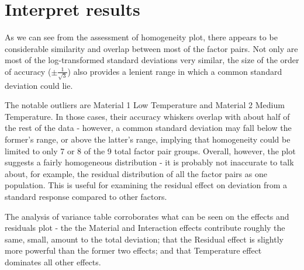 \documentclass[]{article}
\begin{document}
\section{Interpret results}
As we can see from the assessment of homogeneity plot, there appears to be considerable similarity and overlap between most of the factor pairs. Not only are most of the log-transformed standard deviations very similar, the size of the order of accuracy ($\pm\frac{1}{\sqrt{3}}$) also provides a lenient range in which a common standard deviation could lie.

The notable outliers are Material 1 Low Temperature and Material 2 Medium Temperature. In those cases, their accuracy whiskers overlap with about half of the rest of the data - however, a common standard deviation may fall below the former's range, or above the latter's range, implying that homogeneity could be limited to only 7 or 8 of the 9 total factor pair groups. Overall, however, the plot suggests a fairly homogeneous distribution - it is probably not inaccurate to talk about, for example, the residual distribution of all the factor pairs as one population. This is useful for examining the residual effect on deviation from a standard response compared to other factors.

The analysis of variance table corroborates what can be seen on the effects and residuals plot - the the Material and Interaction effects contribute roughly the same, small, amount to the total deviation; that the Residual effect is slightly more powerful than the former two effects; and that Temperature effect dominates all other effects.
\end{document}
